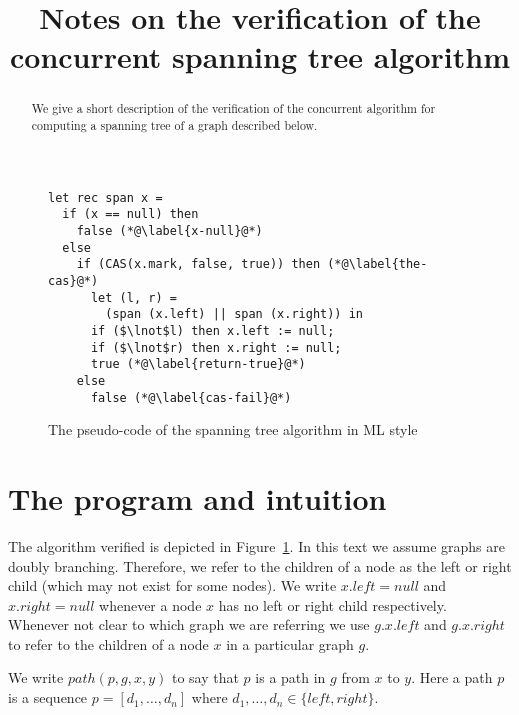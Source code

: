 \documentclass[nocopyrightspace]{sigplanconf}
\title{Notes on the verification of the concurrent spanning tree algorithm}
\newcommand{\path}{\mathit{path}}
\newcommand{\Left}{\mathit{left}}
\newcommand{\Right}{\mathit{right}}
\newcommand{\Null}{\mathit{null}}
\begin{document}
\maketitle

\begin{abstract}
We give a short description of the verification of the concurrent algorithm for computing
a spanning tree of a graph described below.
\end{abstract}

\begin{figure}
\begin{lstlisting}[mathescape=true, language=MyML]
let rec span x =
  if (x == null) then
    false (*@\label{x-null}@*)
  else
    if (CAS(x.mark, false, true)) then (*@\label{the-cas}@*)
      let (l, r) =
        (span (x.left) || span (x.right)) in
      if ($\lnot$l) then x.left := null;
      if ($\lnot$r) then x.right := null;
      true (*@\label{return-true}@*)
    else
      false (*@\label{cas-fail}@*)
\end{lstlisting}
\caption{The pseudo-code of the spanning tree algorithm in ML style}
\label{fig:code}
\end{figure}

\section{The program and intuition}
The algorithm verified is depicted in Figure~\ref{fig:code}.
In this text we assume graphs are doubly branching.
Therefore, we refer to the children of a node as the left or right child (which may not exist for some nodes).
We write $x.\Left = \Null$ and $x.\Right = \Null$ whenever a node $x$ has no left or right child respectively.
Whenever not clear to which graph we are referring we use $g.x.\Left$ and $g.x.\Right$ to refer to the children of a node $x$ in a particular graph $g$.

We write $\path(p, g, x, y)$ to say that $p$ is a path in $g$ from $x$ to $y$.
Here a path $p$ is a sequence
$p = [d_1, \dots, d_n ]$ where $d_1,\dots, d_n \in \{\Left, \Right\}$.
\end{document}
